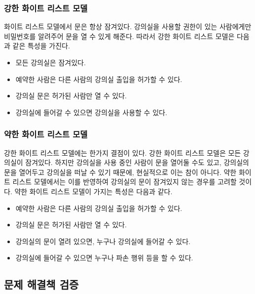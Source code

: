 \documentclass[11pt,a4paper]{article}
\begin{document}
\subsubsection{강한 화이트 리스트 모델}
화이트 리스트 모델에서 문은 항상 잠겨있다. 강의실을 사용할 권한이 있는 사람에게만 비밀번호를 알려주어 문을 열 수 있게 해준다. 따라서 강한 화이트 리스트 모델은 다음과 같은 특성을 가진다.
\begin{itemize}
\item 모든 강의실은 잠겨있다.
\item 예약한 사람은 다른 사람의 강의실 출입을 허가할 수 있다.
\item 강의실 문은 허가된 사람만 열 수 있다.
\item 강의실에 들어갈 수 있으면 강의실을 사용할 수 있다.
\end{itemize}

\subsubsection{약한 화이트 리스트 모델}
강한 화이트 리스트 모델에는 한가지 결점이 있다. 강한 화이트 리스트 모델은 모든 강의실이 잠겨있다. 하지만 강의실을 사용 중인 사람이 문을 열어둘 수도 있고, 강의실의 문을 열어두고 강의실을 떠날 수 있기 때문에, 현실적으로 이는 참이 아니다. 약한 화이트 리스트 모델에서는 이를 반영하여 강의실의 문이 잠겨있지 않는 경우를 고려할 것이다. 약한 화이트 리스트 모델이 가지는 특성은 다음과 같다.
\begin{itemize}
\item 예약한 사람은 다른 사람의 강의실 출입을 허가할 수 있다.
\item 강의실 문은 허가된 사람만 열 수 있다.
\item 강의실의 문이 열려 있으면, 누구나 강의실에 들어갈 수 있다.
\item 강의실에 들어갈 수 있으면 누구나 파손 행위 등을 할 수 있다.
\end{itemize}

\subsection{문제 해결책 검증}
\end{document}
